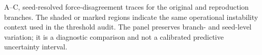 A--C, seed-resolved force-disagreement traces for the original and reproduction branches. The shaded or marked regions indicate the same operational instability context used in the threshold audit. The panel preserves branch- and seed-level variation; it is a diagnostic comparison and not a calibrated predictive uncertainty interval.
